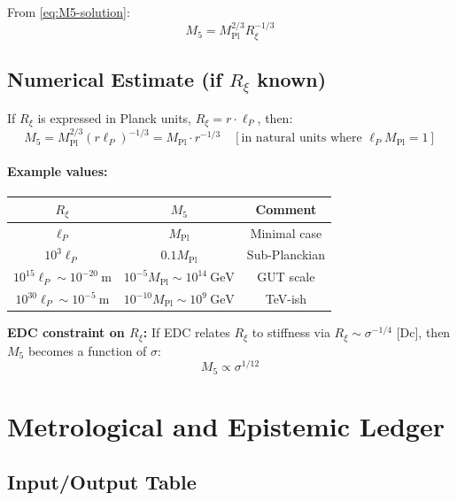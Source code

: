 \documentclass[11pt,a4paper]{article}
\newcommand{\Mpl}{M_{\text{Pl}}}
\newcommand{\Mfive}{M_5}
\newcommand{\Rxi}{R_\xi}
\newcommand{\ellP}{\ell_P}
\begin{document}
From \eqref{eq:M5-solution}:
\begin{equation}
\Mfive = \Mpl^{2/3} \Rxi^{-1/3}
\end{equation}

\subsection{Numerical Estimate (if $\Rxi$ known)}

If $\Rxi$ is expressed in Planck units, $\Rxi = r \cdot \ellP$, then:
\begin{equation}
\Mfive = \Mpl^{2/3} (r \ellP)^{-1/3} = \Mpl \cdot r^{-1/3}
\quad [\text{in natural units where } \ellP \Mpl = 1]
\end{equation}

\paragraph{Example values:}
\begin{center}
\begin{tabular}{@{}ccc@{}}
\toprule
$\Rxi$ & $\Mfive$ & Comment \\
\midrule
$\ellP$ & $\Mpl$ & Minimal case \\
$10^3 \ellP$ & $0.1 \Mpl$ & Sub-Planckian \\
$10^{15} \ellP \sim 10^{-20}~\text{m}$ & $10^{-5} \Mpl \sim 10^{14}~\text{GeV}$ & GUT scale \\
$10^{30} \ellP \sim 10^{-5}~\text{m}$ & $10^{-10} \Mpl \sim 10^{9}~\text{GeV}$ & TeV-ish \\
\bottomrule
\end{tabular}
\end{center}

\textbf{EDC constraint on $\Rxi$:} If EDC relates $\Rxi$ to stiffness via
$\Rxi \sim \sigma^{-1/4}$ [Dc], then $\Mfive$ becomes a function of $\sigma$:
\begin{equation}
\Mfive \propto \sigma^{1/12}
\end{equation}

\section{Metrological and Epistemic Ledger}
\label{sec:ledger}

\subsection{Input/Output Table}
\end{document}

